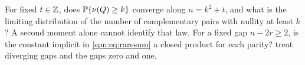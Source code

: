 \begin{question}\label{spn:q:binary}
For fixed $t\in\mathbb{Z}$, does $\mathbb{P}\{\nu(Q)\ge k\}$ converge along $n=k^2+t$,
and what is the limiting distribution of the number of complementary pairs
with nullity at least $k$? A second moment alone cannot identify that law.
For a fixed gap $n-2r\ge2$, is the constant implicit in
\eqref{spn:eq:raresum} a closed product for each parity?
 treat diverging gaps and the gaps
zero and one.
\end{question}
